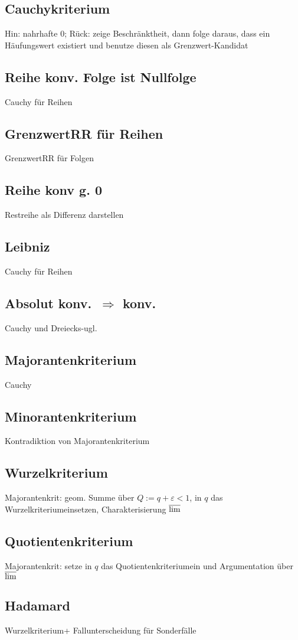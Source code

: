 \subsection{Cauchykriterium }
 Hin: nahrhafte 0; Rück: zeige Beschränktheit, dann folge daraus, dass ein Häufungswert existiert und benutze diesen als Grenzwert-Kandidat
\subsection{Reihe konv.  Folge ist Nullfolge }
 Cauchy für Reihen
\subsection{GrenzwertRR für Reihen }
 GrenzwertRR für Folgen
\subsection{Reihe konv g. 0 }
 Restreihe als Differenz darstellen
\subsection{Leibniz }
 Cauchy für Reihen
\subsection{Absolut konv.\ $\Rightarrow$  konv. }
 Cauchy und Dreiecks-ugl.
\subsection{Majorantenkriterium }
 Cauchy
\subsection{Minorantenkriterium }
 Kontradiktion von Majorantenkriterium
\subsection{Wurzelkriterium }
 Majorantenkrit: geom. Summe über $Q:=q+\varepsilon<1$, in $q$ das Wurzelkriteriumeinsetzen, Charakterisierung $\varlimsup$
\subsection{Quotientenkriterium }
 Majorantenkrit: setze in $q$ das Quotientenkriteriumein und Argumentation über $\varlimsup$
\subsection{Hadamard }
 Wurzelkriterium+ Fallunterscheidung für Sonderfälle
